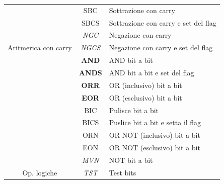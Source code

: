 \documentclass[12pt,a4paper]{article}
\begin{document}
\begin{longtable}{|c|c|l|}
                                                           & SBC                   & Sottrazione con carry                              \\ \cline{2-3} 
                                                           & SBCS                  & Sottrazione con carry e set del flag               \\ \cline{2-3} 
                                                           & \textit{NGC}          & Negazione con carry                                \\ \cline{2-3} 
\multirow{-6}{*}{Aritmerica con carry}                     & \textit{NGCS}         & Negazione con carry e set del flag                 \\ \hline
                                                           & \textbf{AND}          & AND bit a bit                                      \\ \cline{2-3} 
                                                           & \textbf{ANDS}         & AND bit a bit e set del flag                       \\ \cline{2-3} 
                                                           & \textbf{ORR}          & OR (inclusivo) bit a bit                           \\ \cline{2-3} 
                                                           & \textbf{EOR}          & OR (esclusivo) bit a bit                           \\ \cline{2-3} 
                                                           & BIC                   & Pulisce bit a bit                                  \\ \cline{2-3} 
                                                           & BICS                  & Puslice bit a bit e setta il flag                  \\ \cline{2-3} 
                                                           & ORN                   & OR NOT (inclusivo) bit a bit                       \\ \cline{2-3} 
                                                           & EON                   & OR NOT (esclusivo) bit a bit                       \\ \cline{2-3} 
                                                           & \textit{MVN}          & NOT bit a bit                                      \\ \cline{2-3} 
\multirow{-10}{*}{Op. logiche}                      & \textit{TST}          & Test bits                                          \\ \hline

\end{longtable}
\end{document}
